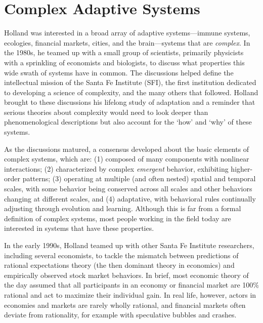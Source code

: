 \documentclass{sig-alternate}
\begin{document}
\section{Complex Adaptive Systems}


Holland was interested in a broad array of adaptive systems---immune
systems, ecologies, financial markets, cities, and the brain---systems
that are \emph{complex}.  In the 1980s, he teamed up with a small
group of scientists, primarily physicists with a sprinkling of
economists and biologists, to discuss what properties this wide swath of systems
have in common.  The discussions helped define the intellectual mission
of the Santa Fe Institute (SFI), the first institution dedicated to
developing a science of complexity, and the many others that followed.
Holland brought to these discussions his lifelong study of
adaptation and a reminder that serious theories about complexity would
need to look deeper than phenomenological descriptions but also
account for the `how' and `why' of these systems.

As the discussions matured, a consensus developed about the basic
elements of complex systems, which are: (1) 
composed of many
components with nonlinear interactions; (2) 
characterized by complex \emph{emergent} behavior, exhibiting
higher-order patterns; (3) 
operating at multiple (and often
nested) spatial and temporal scales, with some behavior being
conserved across all scales and other behaviors changing at different
scales, and (4) 
adaptative, with 
behavioral rules continually adjusting through evolution and learning.  Although this
is far from a formal definition of complex systems, most people
working in the field today are interested in systems that have these
properties.


In the early 1990s, Holland teamed up with other Santa Fe Institute researchers,
including several economists, to tackle the mismatch between predictions
of rational expectations theory (the then dominant theory in economics) 
and empirically observed stock market behaviors. 
In brief, most
economic theory of the day assumed that all participants in an economy
or financial market are 100\% rational and act to maximize their
individual gain.  In real life, however, actors in economies
and markets are rarely wholly rational, and financial markets often deviate
from rationality, for example with speculative bubbles and crashes.
\end{document}
